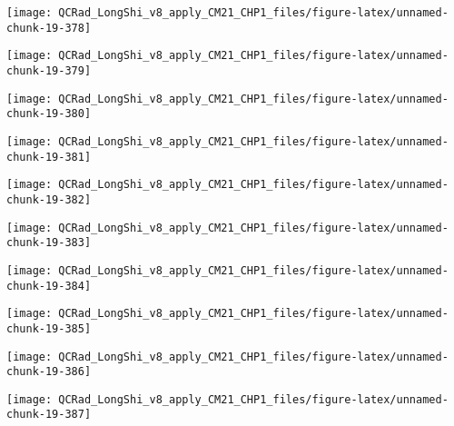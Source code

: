 \documentclass[
  10pt,
  a4paper,oneside]{article}
\begin{document}
\begin{center}\texttt{[image: QCRad\_LongShi\_v8\_apply\_CM21\_CHP1\_files/figure-latex/unnamed-chunk-19-378]} \end{center}

\begin{center}\texttt{[image: QCRad\_LongShi\_v8\_apply\_CM21\_CHP1\_files/figure-latex/unnamed-chunk-19-379]} \end{center}

\begin{center}\texttt{[image: QCRad\_LongShi\_v8\_apply\_CM21\_CHP1\_files/figure-latex/unnamed-chunk-19-380]} \end{center}

\begin{center}\texttt{[image: QCRad\_LongShi\_v8\_apply\_CM21\_CHP1\_files/figure-latex/unnamed-chunk-19-381]} \end{center}

\begin{center}\texttt{[image: QCRad\_LongShi\_v8\_apply\_CM21\_CHP1\_files/figure-latex/unnamed-chunk-19-382]} \end{center}

\begin{center}\texttt{[image: QCRad\_LongShi\_v8\_apply\_CM21\_CHP1\_files/figure-latex/unnamed-chunk-19-383]} \end{center}

\begin{center}\texttt{[image: QCRad\_LongShi\_v8\_apply\_CM21\_CHP1\_files/figure-latex/unnamed-chunk-19-384]} \end{center}

\begin{center}\texttt{[image: QCRad\_LongShi\_v8\_apply\_CM21\_CHP1\_files/figure-latex/unnamed-chunk-19-385]} \end{center}

\begin{center}\texttt{[image: QCRad\_LongShi\_v8\_apply\_CM21\_CHP1\_files/figure-latex/unnamed-chunk-19-386]} \end{center}

\begin{center}\texttt{[image: QCRad\_LongShi\_v8\_apply\_CM21\_CHP1\_files/figure-latex/unnamed-chunk-19-387]} \end{center}
\end{document}
